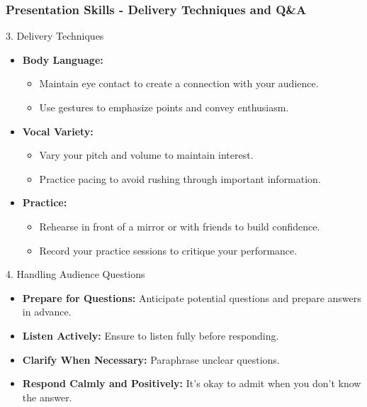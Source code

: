 \documentclass{beamer}
\begin{document}
\begin{frame}[fragile]
    \frametitle{Presentation Skills - Delivery Techniques and Q&A}
    \begin{block}{3. Delivery Techniques}
        \begin{itemize}
            \item \textbf{Body Language:}
              \begin{itemize}
                  \item Maintain eye contact to create a connection with your audience.
                  \item Use gestures to emphasize points and convey enthusiasm.
              \end{itemize}
            \item \textbf{Vocal Variety:}
              \begin{itemize}
                  \item Vary your pitch and volume to maintain interest.
                  \item Practice pacing to avoid rushing through important information.
              \end{itemize}
            \item \textbf{Practice:}
              \begin{itemize}
                  \item Rehearse in front of a mirror or with friends to build confidence.
                  \item Record your practice sessions to critique your performance.
              \end{itemize}
        \end{itemize}
    \end{block}
    
    \begin{block}{4. Handling Audience Questions}
        \begin{itemize}
            \item \textbf{Prepare for Questions:} Anticipate potential questions and prepare answers in advance.
            \item \textbf{Listen Actively:} Ensure to listen fully before responding.
            \item \textbf{Clarify When Necessary:} Paraphrase unclear questions.
            \item \textbf{Respond Calmly and Positively:} It's okay to admit when you don't know the answer.
        \end{itemize}
    \end{block}
\end{frame}
\end{document}

